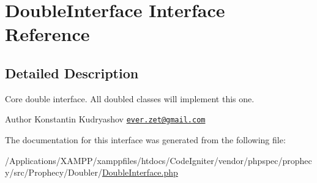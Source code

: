 \hypertarget{interface_prophecy_1_1_doubler_1_1_double_interface}{}\section{Double\+Interface Interface Reference}
\label{interface_prophecy_1_1_doubler_1_1_double_interface}


\subsection{Detailed Description}
Core double interface. All doubled classes will implement this one.

\begin{DoxyAuthor}{Author}
Konstantin Kudryashov \href{mailto:ever.zet@gmail.com}{\tt ever.\+zet@gmail.\+com} 
\end{DoxyAuthor}


The documentation for this interface was generated from the following file\+:\begin{DoxyCompactItemize}
\item 
/\+Applications/\+X\+A\+M\+P\+P/xamppfiles/htdocs/\+Code\+Igniter/vendor/phpspec/prophecy/src/\+Prophecy/\+Doubler/\mbox{\hyperlink{_double_interface_8php}{Double\+Interface.\+php}}\end{DoxyCompactItemize}
